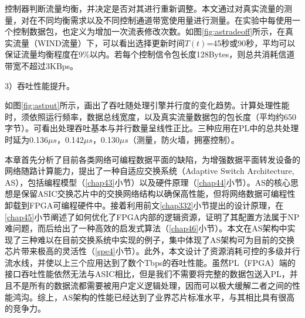 控制器判断流量均衡，并决定是否对其进行重新调整。本文通过对真实流量的测量，对在不同均衡需求以及不同控制通道带宽使用量进行测量。在实验中每使用一个控制数据包，也定义为增加一次流表修改次数。如图\ref{fig:astradeoff}所示，在真实流量（WIND流量）下，可以看出选择更新时间$ T(t) $=45秒或90秒，平均可以保证流量均衡程度在9\%以内。若每个控制信令包长度128Bytes，则总共消耗信道带宽不超过3KBps。





3）吞吐性能提升。



如图\ref{fig:astput}所示，画出了吞吐随处理引擎并行度的变化趋势。计算处理性能时，须依照运行频率，数据总线宽度，以及真实流量数据包的包长度（平均约650字节）。可看出处理吞吐基本与并行数量呈线性正比。三种应用在PL中的总共处理时延为0.136$ \mu s $，0.142$ \mu s $，0.130$ \mu s $（测量，防火墙，拥塞控制）。


\label{chap48}

本章首先分析了目前各类网络可编程数据平面的缺陷，为增强数据平面转发设备的网络随路计算能力，提出了一种自适应交换系统（Adaptive Switch Architecture, AS），包括编程模型（\ref{chap43}小节）以及硬件原理（\ref{chap44}小节）。AS的核心思想是保留ASIC交换芯片中的交换网络结构以确保高性能，但将网络数据可编程性卸载到FPGA可编程硬件中。接着利用前文\ref{chap332}小节提出的设计原理，在\ref{chap45}小节阐述了如何优化了FPGA内部的逻辑资源，证明了其配置方法属于NP难问题，而后给出了一种高效的启发式算法（\ref{chap46}小节）。本文在AS架构中实现了三种难以在目前交换系统中实现的例子，集中体现了AS架构可为目前的交换芯片带来极高的灵活性（\ref{spe4}小节）。此外，本文设计了资源消耗可控的多级并行流水线，并使以上三个应用达到了数个Tbps的吞吐性能。虽然PL（FPGA）端的接口吞吐性能依然无法与ASIC相比，但是我们不需要将完整的数据包送入PL，并且不是所有的数据流都需要被用户定义逻辑处理，因而可以极大缓解二者之间的性能鸿沟。综上，AS架构的性能已经达到了业界芯片标准水平，与其相比具有很高的竞争力。

